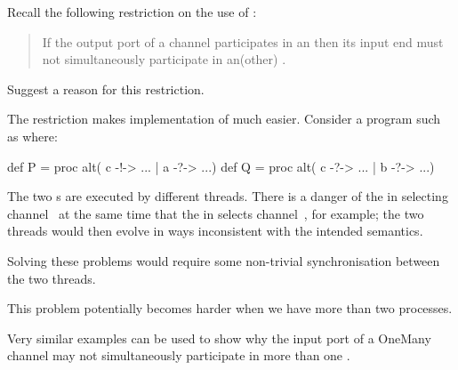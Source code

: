 \begin{nontutequestion}
Recall the following restriction on the use of :
%
\begin{quote}
If the output port of a channel participates in an  then its input
end must not simultaneously participate in an(other) .
\end{quote}
%
Suggest a reason for this restriction.
\end{nontutequestion}


\begin{nontuteanswer}
The restriction makes implementation of  much easier.  Consider a
program such as  where:
%
\begin{scala}
def P = proc{ alt( c -!-> ... | a -?-> ...) }
def Q = proc{ alt( c -?-> ... | b -?-> ...) }
\end{scala}
%
The two s are executed by different threads.  There is a danger of
the  in  selecting channel~ at the same time that
the  in  selects channel~, for example; the two
threads would then evolve in ways inconsistent with the intended semantics.    

Solving these problems would require some non-trivial synchronisation between
the two threads.

This problem potentially becomes harder when we have more than two processes.

Very similar examples can be used to show why the input port of a OneMany
channel may not simultaneously participate in more than one . 
\end{nontuteanswer}

